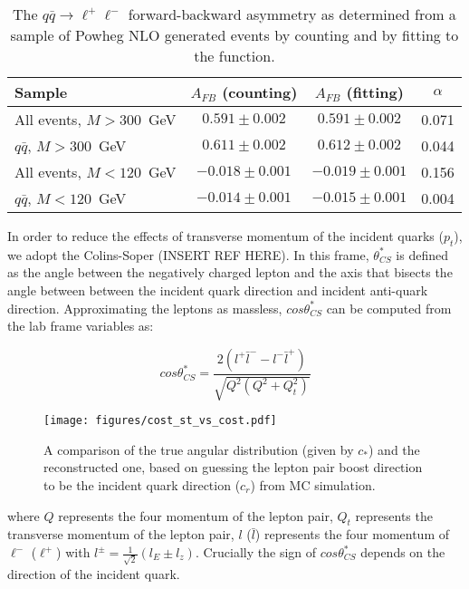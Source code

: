 \documentclass[
    10pt, %
    a4paper, %
    oneside, %
    headinclude,footinclude, %
    BCOR5mm, %
]{scrartcl}
\begin{document}
\begin{table}[hbt]
    \centering
    \caption{The $q\bar q\to \ell^+\ell^-$ forward-backward asymmetry as determined from a sample of Powheg NLO generated events by counting and by fitting to the function.}
    \label{tab:afb_counting_fitting}
    \vspace{3pt}
    \begin{tabular}{|l|ccc|}\hline
        Sample      & $A_{FB}$ (counting) & $A_{FB}$ (fitting) & $\alpha$ \\ \hline
        All events, $M>300$~GeV  & $0.591\pm0.002$  & $0.591\pm0.002$  & 0.071     \\ 
        $q\bar q$, $M>300$~GeV  & $0.611\pm0.002$  & $0.612\pm0.002$  & 0.044    \\ 
        All events, $M<120$~GeV  & $-0.018\pm0.001$  & $-0.019\pm0.001$  & 0.156     \\ 
        $q\bar q$, $M<120$~GeV  & $-0.014\pm0.001$  & $-0.015\pm0.001$  & 0.004     \\ 
        \hline
    \end{tabular}
\end{table}

In order to reduce the effects of transverse momentum of the incident quarks ($p_t$), we adopt the Colins-Soper (INSERT REF HERE). In this frame,
$\theta^*_{CS}$ is defined as the angle between the negatively charged lepton and the axis that bisects the angle between between the incident quark direction 
and incident anti-quark direction. Approximating the leptons as massless, $cos \theta^*_{CS}$ can be computed from the lab frame variables as:

\begin{equation}
    \label{eq:cs}
    cos \theta^{*}_{CS} = \frac{2(l^+ \bar l^- - l^- \bar l^+)}{  \sqrt{Q^2(Q^2 + Q^2_t)}  }
\end{equation}

\begin{figure}[h]
    \texttt{[image: figures/cost\_st\_vs\_cost.pdf]}
    \centering
    \caption{A comparison of the true angular distribution (given by $c_*$) and the reconstructed
        one, based on guessing the lepton pair boost direction to be the incident quark direction ($c_r$)
    from MC simulation.}
    \label{fig:cost_st}
\end{figure}

where $Q$ represents the four momentum of the lepton pair, $Q_t$ represents the transverse momentum of 
the lepton pair, $l$ ($\bar l$) represents the four momentum of $\ell^-$ ($\ell ^+$) with 
$l^{\pm} = \frac{1}{\sqrt{2}}(l_E \pm l_z)$. Crucially the sign of $cos \theta^{*}_{CS}$ depends 
on the direction of the incident quark. 
\end{document}
